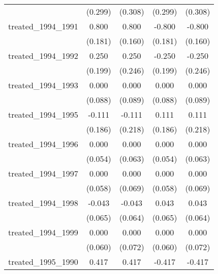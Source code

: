 {\begin{tabular}{l*{4}{c}}
            &     (0.299)         &     (0.308)         &     (0.299)         &     (0.308)         \\
[1em]
treated\_1994\_1991&       0.800\sym{***}&       0.800\sym{***}&      -0.800\sym{***}&      -0.800\sym{***}\\
            &     (0.181)         &     (0.160)         &     (0.181)         &     (0.160)         \\
[1em]
treated\_1994\_1992&       0.250         &       0.250         &      -0.250         &      -0.250         \\
            &     (0.199)         &     (0.246)         &     (0.199)         &     (0.246)         \\
[1em]
treated\_1994\_1993&       0.000         &       0.000         &       0.000         &       0.000         \\
            &     (0.088)         &     (0.089)         &     (0.088)         &     (0.089)         \\
[1em]
treated\_1994\_1995&      -0.111         &      -0.111         &       0.111         &       0.111         \\
            &     (0.186)         &     (0.218)         &     (0.186)         &     (0.218)         \\
[1em]
treated\_1994\_1996&       0.000         &       0.000         &       0.000         &       0.000         \\
            &     (0.054)         &     (0.063)         &     (0.054)         &     (0.063)         \\
[1em]
treated\_1994\_1997&       0.000         &       0.000         &       0.000         &       0.000         \\
            &     (0.058)         &     (0.069)         &     (0.058)         &     (0.069)         \\
[1em]
treated\_1994\_1998&      -0.043         &      -0.043         &       0.043         &       0.043         \\
            &     (0.065)         &     (0.064)         &     (0.065)         &     (0.064)         \\
[1em]
treated\_1994\_1999&       0.000         &       0.000         &       0.000         &       0.000         \\
            &     (0.060)         &     (0.072)         &     (0.060)         &     (0.072)         \\
[1em]
treated\_1995\_1990&       0.417         &       0.417         &      -0.417         &      -0.417         \\

\end{tabular}}
